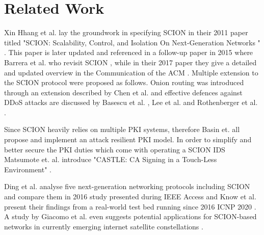 \documentclass[../eva1_scion.tex]{subfiles}
\begin{document}
    \section{Related Work}\label{sec:related_work}

    Xin Hhang et al. lay the groundwork in specifying SCION in their 2011 paper titled "SCION: Scalability, Control, and Isolation On Next-Generation Networks
" \cite{scion_2011}. This paper is later updated and referenced in a follow-up paper in 2015 where Barrera et al. who revisit SCION \cite{scion_2015}, while in their 2017 paper they give a detailed and updated overview in the Communication of the ACM \cite{scion_2017}. Multiple extension to the SCION protocol were proposed as follows. Onion routing was introduced through an extension described by Chen et al. \cite{hornet_2015, hornet_2016} and effective defences against DDoS attacks are discussed by Basescu et al. \cite{sibra_2016}, Lee et al. \cite{lee_2017} and Rothenberger et al. \cite{piskes_2020}.

Since SCION heavily relies on multiple PKI systems, therefore Basin et. all propose \cite{arpki_2014} and implement \cite{arpki_2018} an attack resilient PKI model. In order to simplify and better secure the PKI duties which come with operating a SCION IDS Matsumote et. al. introduce "CASTLE: CA Signing in a Touch-Less Environment" \cite{castle_2016}.

Ding et al. analyse five next-generation networking protocols including SCION and compare them in 2016 study presented during  IEEE Access \cite{ding_2016} and Know et al. present their findings from a real-world test bed running since 2016 ICNP 2020 \cite{testbed_2020}. A study by Giacomo et al. even suggests potential applications for SCION-based networks in currently emerging internet satellite constellations \cite{giuliari_2020}.
\end{document}
